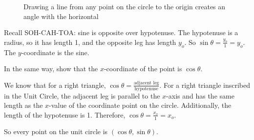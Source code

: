 \begin{figure}[H]
    \centering
    \caption{Drawing a line from any point on the circle to the origin creates 
    an angle with the horizontal}
    \label{fig:unit_cicle_zoom}
\end{figure}

Recall SOH-CAH-TOA: sine is opposite over hypotenuse.
The hypotenuse is a radius, so it has length 1, and the opposite leg has
length $y_o$. So $\sin{\theta} = \frac{y_o}{1} = y_o$. The $y$-coordinate
is the sine. 

\begin{Exercise}[label = sine]
In the same way, show that the $x$-coordinate of the point is
$\cos{\theta}$. 
\vspace{20mm}
\end{Exercise}

\begin{Answer}[ref = sine]
We know that for a right triangle, $\cos{\theta} = \frac{\text{adjacent leg}}{
\text{hypotenuse}}$. For a right triangle inscribed in the Unit Circle, the 
adjacent leg is parallel to the $x$-axis and has the same length as the 
$x$-value of the coordinate point on the circle. Additionally, the length of 
the hypotenuse is 1. Therefore, $\cos{\theta} = \frac{x_o}{1} = x_o$. 
\end{Answer}

So every point on the unit circle is $(\cos\theta, \sin\theta)$. 

